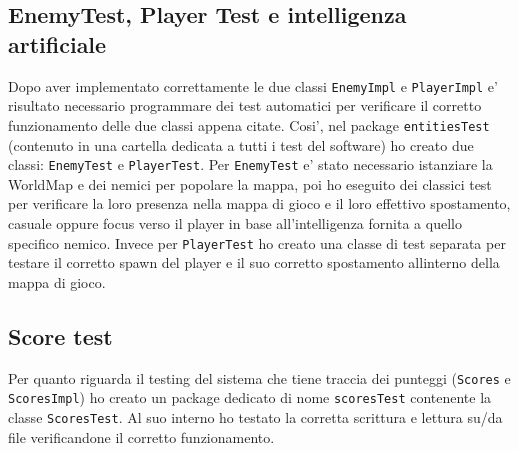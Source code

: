 \documentclass[a4paper,12pt]{report}
\begin{document}
\subsection{EnemyTest, Player Test e intelligenza artificiale}
Dopo aver implementato correttamente le due classi \verb|EnemyImpl| e \verb|PlayerImpl| e' risultato necessario programmare dei test automatici per verificare il corretto funzionamento delle due classi appena citate. Cosi', nel package \verb|entitiesTest| (contenuto in una cartella dedicata a tutti i test del software) ho creato due classi: \verb|EnemyTest| e \verb|PlayerTest|. Per \verb|EnemyTest| e' stato necessario istanziare la WorldMap e dei nemici per popolare la mappa, poi ho eseguito dei classici test per verificare la loro presenza nella mappa di gioco e il loro effettivo spostamento, casuale oppure focus verso il player in base all'intelligenza fornita a quello specifico nemico. Invece per \verb|PlayerTest| ho creato una classe di test separata per testare il corretto spawn del player e il suo corretto spostamento allinterno della mappa di gioco.

\subsection{Score test}
Per quanto riguarda il testing del sistema che tiene traccia dei punteggi (\verb|Scores| e \verb|ScoresImpl|) ho creato un package dedicato di nome \verb|scoresTest| contenente la classe \verb|ScoresTest|. Al suo interno ho testato la corretta scrittura e lettura su/da file verificandone il corretto funzionamento.
\end{document}
